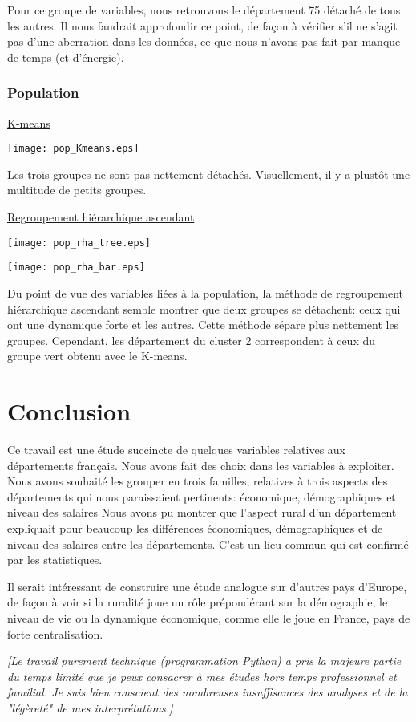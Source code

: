 \documentclass[a4paper,11pt]{article}
\begin{document}
Pour ce groupe de variables, nous retrouvons le département 75 détaché de tous les autres.
Il nous faudrait approfondir ce point, de façon à vérifier s'il ne s'agit pas d'une aberration dans les données, ce que nous n'avons pas fait par manque de temps (et d'énergie).


\subsubsection{Population}
\underline{K-means}
\begin{center}
\texttt{[image: pop\_Kmeans.eps]}
\end{center}
Les trois groupes ne sont pas nettement détachés. Visuellement, il y a plustôt une multitude de petits groupes.


\medskip
\underline{Regroupement hiérarchique ascendant}
\begin{center}
\texttt{[image: pop\_rha\_tree.eps]}
\end{center}
\begin{center}
\texttt{[image: pop\_rha\_bar.eps]}
\end{center}

Du point de vue des variables liées à la population, la méthode de regroupement hiérarchique ascendant semble montrer que deux groupes se détachent: ceux qui ont une dynamique forte et les autres.
Cette méthode sépare plus nettement les groupes.
Cependant, les département du cluster 2 correspondent à ceux du groupe vert obtenu avec le K-means.


\section{Conclusion}

Ce travail est une étude succincte de quelques variables relatives aux départements français.
Nous avons fait des choix dans les variables à exploiter.
Nous avons souhaité les grouper en trois familles, relatives à trois aspects des départements qui nous paraissaient pertinents: économique, démographiques et niveau des salaires
Nous avons pu montrer que l'aspect rural d'un département expliquait pour beaucoup les différences économiques, démographiques et de niveau des salaires entre les départements.
C'est un lieu commun qui est confirmé par les statistiques.

Il serait intéressant de construire une étude analogue sur d'autres pays d'Europe, de façon à voir si la ruralité joue un rôle prépondérant sur la démographie, le niveau de vie ou la dynamique économique, comme elle le joue en France, pays de forte centralisation. 


\bigskip
\bigskip
\textit{[Le travail purement technique (programmation Python) a pris la majeure partie du temps limité que je peux consacrer à mes études hors temps professionnel et familial.
Je suis bien conscient des nombreuses insuffisances des analyses et de la "légèreté" de mes interprétations.]}
\end{document}
